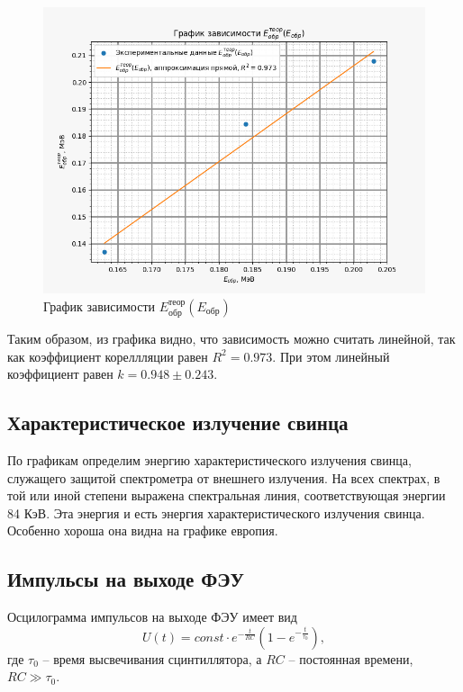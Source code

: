     \begin{figure}[H]
        \centering
        \includegraphics[width = 13 cm]{images/E_inv}
        \caption{График зависимости  $E_{\text{обр}}^{\text{теор}}(E_{\text{обр}})$}
        \label{E_inv}
    \end{figure}

    Таким образом, из графика видно, что зависимость можно считать линейной, так как коэффициент кореллляции равен $R^2 = 0.973$. При этом линейный коэффициент равен $k = 0.948 \pm 0.243$.

\subsection{Характеристическое излучение свинца}    

    По графикам определим энергию характеристического излучения свинца, служащего защитой спектрометра от внешнего излучения. На всех спектрах, в той или иной степени выражена спектральная линия, соответствующая энергии 84 КэВ. Эта энергия и есть энергия характеристического излучения свинца. Особенно хороша она видна на графике европия.

\subsection{Импульсы на выходе ФЭУ}

    Осцилограмма импульсов на выходе ФЭУ имеет вид
    \begin{equation}
        U(t) = const \cdot e^{-\frac{t}{RC}} \left( 1 - e^{-\frac{t}{\tau_0}} \right),
    \end{equation}
    где $\tau_0$ -- время высвечивания сцинтиллятора, а $RC$ -- постоянная времени, $RC \gg \tau_0$.

